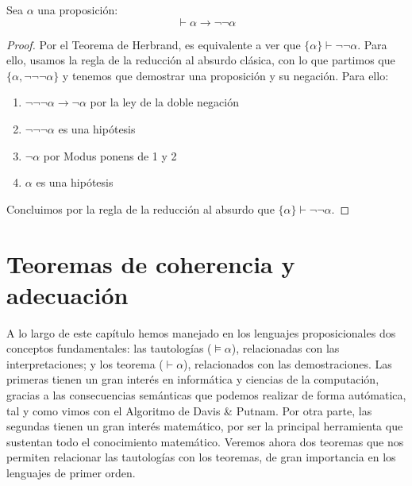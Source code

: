 \begin{prop}
    Sea $\alpha$ una proposición:
    \begin{equation*}
        \vdash \alpha\to\lnot\lnot\alpha
    \end{equation*}
    \begin{proof}
        Por el Teorema de Herbrand, es equivalente a ver que $\{\alpha\}\vdash \lnot\lnot\alpha$. Para ello, usamos la regla de la reducción al absurdo clásica, con lo que partimos que $\{\alpha,\lnot\lnot\lnot\alpha\}$ y tenemos que demostrar una proposición y su negación. Para ello:
        \begin{enumerate}
            \item $\lnot\lnot\lnot\alpha\to\lnot\alpha$ por la ley de la doble negación
            \item $\lnot\lnot\lnot\alpha$ es una hipótesis
            \item $\lnot\alpha$ por Modus ponens de 1 y 2
            \item $\alpha$ es una hipótesis
        \end{enumerate}
        Concluimos por la regla de la reducción al absurdo que $\{\alpha\}\vdash \lnot\lnot\alpha$.
    \end{proof}
\end{prop}

\section{Teoremas de coherencia y adecuación}
A lo largo de este capítulo hemos manejado en los lenguajes proposicionales dos conceptos fundamentales: las tautologías ($\vDash \alpha$), relacionadas con las interpretaciones; y los teorema ($\vdash \alpha$), relacionados con las demostraciones. Las primeras tienen un gran interés en informática y ciencias de la computación, gracias a las consecuencias semánticas que podemos realizar de forma autómatica, tal y como vimos con el Algoritmo de Davis \& Putnam. Por otra parte, las segundas tienen un gran interés matemático, por ser la principal herramienta que sustentan todo el conocimiento matemático. Veremos ahora dos teoremas que nos permiten relacionar las tautologías con los teoremas, de gran importancia en los lenguajes de primer orden.

